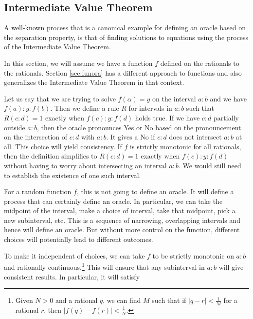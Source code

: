 \documentclass[12pt]{article}
\theoremstyle{remark}
\begin{document}
\subsection{Intermediate Value Theorem}\label{sec:ivt}

A well-known process that is a canonical example for defining an oracle based on the separation property, is that of finding solutions to equations using the process of the Intermediate Value Theorem. 

In this section, we will assume we have a function $f$ defined on the rationals to the rationals. Section \ref{sec:funora} has a different approach to functions and also generalizes the Intermediate Value Theorem in that context. 

Let us say that we are trying to solve $f(\alpha) = y$ on the interval $a:b$ and we have $f(a):y:f(b)$. Then we define a rule $R$ for intervals in $a:b$ such that $R(c:d) = 1$ exactly when $f(c):y:f(d)$ holds true. If we have $c:d$ partially outside $a:b$, then the oracle pronounces Yes or No based on the pronouncement on the intersection of $c:d$ with $a:b$. It gives a No if $c:d$ does not intersect $a:b$ at all. This choice will yield consistency. If $f$ is strictly monotonic for all rationals, then the definition simplifies to $R(c:d)=1$ exactly when $f(c):y:f(d)$ without having to worry about intersecting an interval $a:b$. We would still need to establish the existence of one such interval. 

For a random function $f$, this is not going to define an oracle. It will define a process that can certainly define an oracle. In particular, we can take the midpoint of the interval, make a choice of interval, take that midpoint, pick a new subinterval, etc. This is a sequence of narrowing, overlapping intervals and hence will define an oracle. But without more control on the function, different choices will potentially lead to different outcomes. 

To make it independent of choices, we can take $f$ to be strictly monotonic on $a:b$ and rationally continuous.\footnote{Given $N >0$ and a rational $q$, we can find $M$ such that if $|q-r|<\frac{1}{M}$ for a rational $r$, then $|f(q)-f(r)| < \frac{1}{N}$.} This will ensure that any subinterval in $a:b$ will give consistent results. In particular, it will satisfy
\end{document}
